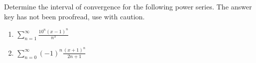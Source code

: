 Determine the interval of convergence for the following power series. The answer key has not been proofread, use with caution.
\begin{enumerate}
\item $\displaystyle \sum \limits_{n= 1}^{\infty} \frac{ 10^n(x-1)^n}{n^3}$
\item $\displaystyle \sum\limits_{n=0}^{\infty}(-1)^n \frac{(x+1)^n }{ 2n+1} $
\answer{$x\in (-2, 0]$}
\end{enumerate}